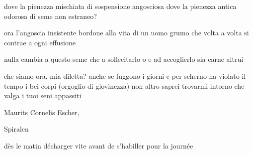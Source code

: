 \clearpage


\begin{poem}
	\begin{stanza}
		dove la pienezza mischiata\verseline
		di sospensione angosciosa\verseline
		dove la pienezza antica\verseline
		odorosa di seme non estraneo?
	\end{stanza}

	\begin{stanza}
		ora l’angoscia insistente\verseline
		bordone alla vita di un uomo\verseline
		grumo che volta a volta\verseline
		si contrae a ogni effusione
	\end{stanza}

	\begin{stanza}
		nulla cambia a questo seme\verseline
		che a sollecitarlo\verseline
		o e ad accoglierlo\verseline
		sia carne altrui
	\end{stanza}
\end{poem}

\clearpage


\begin{poem}
	\begin{stanza}
		che siamo ora, mia diletta?\verseline
		anche se fuggono i giorni\verseline
		e per scherno ha violato il tempo\verseline
		i bei corpi (orgoglio di giovinezza)\verseline
		non altro saprei trovarmi intorno\verseline
		che valga i tuoi seni appassiti
	\end{stanza}
\end{poem}

\clearpage


\begin{artItem}
	Maurits Cornelis Escher, \begin{otherlanguage}{dutch}%
		Spiralen%
	\end{otherlanguage}
\end{artItem}

\begin{poem}
	\begin{otherlanguage}{french}
		\begin{stanza}
			dès le matin décharger vite\verseline
			avant de s'habiller pour la journée
		\end{stanza}
	\end{otherlanguage}
\end{poem}
